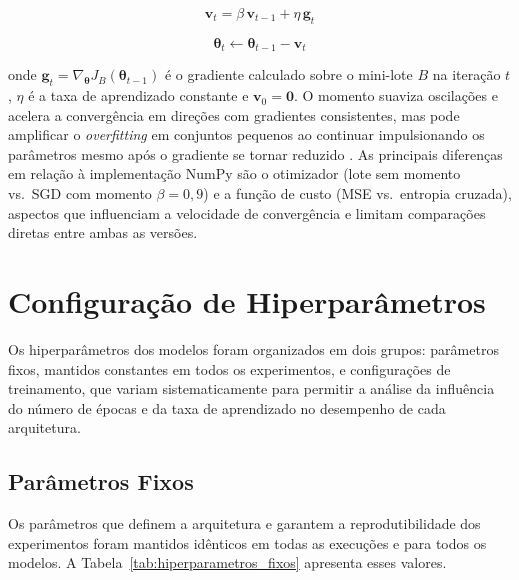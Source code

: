 \begin{equation}
\mathbf{v}_t = \beta \, \mathbf{v}_{t-1} + \eta \, \mathbf{g}_t
\label{eq:sgd_momentum_v}
\end{equation}

\begin{equation}
\boldsymbol{\theta}_t \leftarrow \boldsymbol{\theta}_{t-1} - \mathbf{v}_t
\label{eq:sgd_momentum_update}
\end{equation}

onde $\mathbf{g}_t = \nabla_{\boldsymbol{\theta}} J_B(\boldsymbol{\theta}_{t-1})$ é o gradiente calculado sobre o mini-lote $B$ na iteração $t$, $\eta$ é a taxa de aprendizado constante e $\mathbf{v}_0 = \mathbf{0}$. O momento suaviza oscilações e acelera a convergência em direções com gradientes consistentes, mas pode amplificar o \textit{overfitting} em conjuntos pequenos ao continuar impulsionando os parâmetros mesmo após o gradiente se tornar reduzido \cite{silva2016}. As principais diferenças em relação à implementação NumPy são o otimizador (lote sem momento vs.\ SGD com momento $\beta = 0{,}9$) e a função de custo (MSE vs.\ entropia cruzada), aspectos que influenciam a velocidade de convergência e limitam comparações diretas entre ambas as versões.

\section{Configuração de Hiperparâmetros}
\label{sec:hiperparametros}

Os hiperparâmetros dos modelos foram organizados em dois grupos: parâmetros fixos, mantidos constantes em todos os experimentos, e configurações de treinamento, que variam sistematicamente para permitir a análise da influência do número de épocas e da taxa de aprendizado no desempenho de cada arquitetura.

\subsection{Parâmetros Fixos}

Os parâmetros que definem a arquitetura e garantem a reprodutibilidade dos experimentos foram mantidos idênticos em todas as execuções e para todos os modelos. A Tabela~\ref{tab:hiperparametros_fixos} apresenta esses valores.

